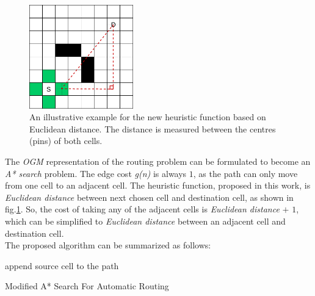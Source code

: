 \begin{figure}
    \centering
    \includegraphics[width=0.4\textwidth]{figures/grid_euclid.png}
    \caption{An illustrative example for the new heuristic function based on Euclidean distance. The distance is measured between the centres (pins) of both cells.}
    \label{fig:euclid}
\end{figure}

The \emph{OGM} representation of the routing problem can be formulated to become an \emph{A* search} problem. The edge cost \emph{g(n)} is always $1$, as the path can only move from one cell to an adjacent cell. The heuristic function, proposed in this work, is \emph{Euclidean distance} between next chosen cell and destination cell, as shown in  fig.\ref{fig:euclid}. So, the cost of taking any of the adjacent cells is \emph{Euclidean distance} $+$ $1$, which can be simplified to \emph{Euclidean distance} between an adjacent cell and destination cell.\\

The proposed algorithm can be summarized as follows:

\begin{algorithm}
\SetAlgoLined
{}
 append source cell to the path\;
 \caption{Modified A* Search For Automatic Routing}
\end{algorithm}
